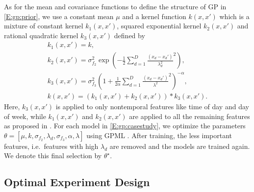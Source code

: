 As for the mean and covariance functions to define the structure of GP in \eqref{E:gp:prior}, we use a constant mean \(\mu\) and a kernel function \(k(x,x')\) which is a mixture of constant kernel \(k_1(x,x')\), squared exponential kernel \(k_2(x,x')\) and rational quadratic kernel \(k_3(x,x')\) defined by
\begin{gather}
k_1(x,x')  = k, \nonumber\\
k_2(x,x') = \sigma_{f_2}^2 \exp \left( -\frac{1}{2} \sum_{d=1}^D \frac{(x_d-x_d')}{{\lambda_d^2}}^2 \right),
 \nonumber\\
 k_3(x,x') = \sigma_{f_3}^2  \left( 1+ \frac{1}{2\alpha} \sum_{d=1}^D \frac{(x_d-x_d')}{{\lambda^2}}^2 \right)^{-\alpha},  \nonumber\\
k(x,x') = \left(k_1(x,x') + k_2(x,x')\right)*k_3(x,x').
\end{gather}
Here, \(k_3(x,x')\) is applied to only nontemporal features like time of day and day of week, while \(k_1(x,x')\) and \(k_2(x,x')\) are applied to all the remaining features as proposed in \cite{nghiemetal16gp}. For each model in \eqref{E:gp:casestudy}, we optimize the parameters \(\theta = [\mu, k, \sigma_{f_2}, \lambda_d, \sigma_{f_3}, \alpha, \lambda] \) using GPML \cite{Rasmussen2010}. After training, the less important features, i.e.~features with high \(\lambda_d\) are removed and the models are trained again. We denote this final selection by \(\theta^\star\).


\subsection{Optimal Experiment Design}

